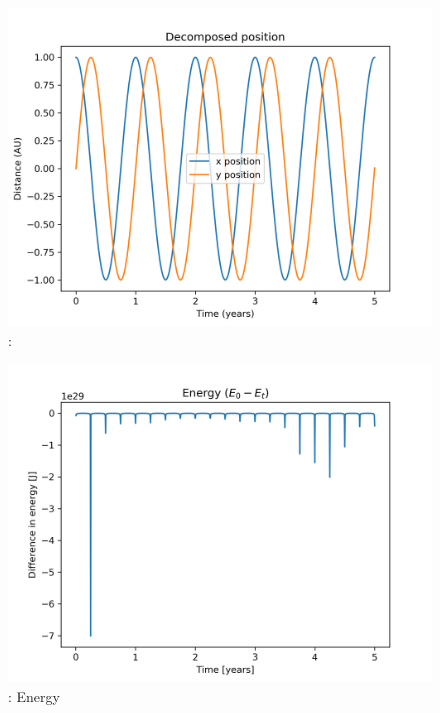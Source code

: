 \documentclass{article}
\begin{document}
\begin{figure}[H]
    \begin{center}
        \includegraphics[width=\textwidth]{./Plot/xy_vs_time.png}
        \caption{: }
        \label{fig:position}
    \end{center}
\end{figure}

\begin{figure}[H]
    \begin{center}
        \includegraphics[width=\textwidth]{./Plot/energy.png}
        \caption{: Energy}
        \label{fig:energy}
    \end{center}
\end{figure}
\end{document}
